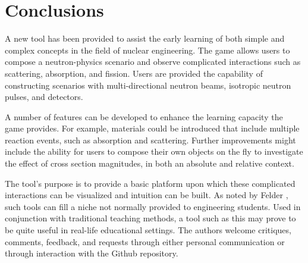 \documentclass{anstrans}
\begin{document}
\section{Conclusions}

A new tool has been provided to assist the early learning of both simple and
complex concepts in the field of nuclear engineering. The game allows users to
compose a neutron-physics scenario and observe complicated interactions such as
scattering, absorption, and fission. Users are provided the capability of
constructing scenarios with multi-directional neutron beams, isotropic neutron
pulses, and detectors. 

A number of features can be developed to enhance the learning capacity the game
provides. For example, materials could be introduced that include multiple
reaction events, such as absorption and scattering. Further improvements might
include the ability for users to compose their own objects on the fly to
investigate the effect of cross section magnitudes, in both an absolute and
relative context. 

The tool's purpose is to provide a basic platform upon which these complicated
interactions can be visualized and intuition can be built. As noted by Felder
\cite{felder2000learning}, such tools can fill a niche not normally provided to
engineering students. Used in conjunction with traditional teaching methods, a
tool such as this may prove to be quite useful in real-life educational
settings. The authors welcome critiques, comments, feedback, and requests
through either personal communication or through interaction with the Github
repository.



\end{document}
